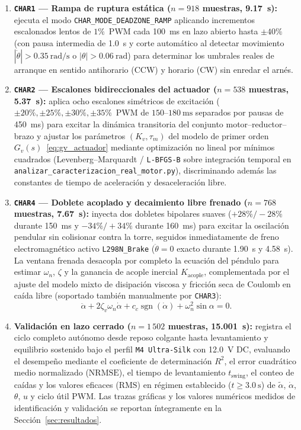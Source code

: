 \begin{enumerate}
    \item \textbf{\texttt{CHAR1} --- Rampa de ruptura estática ($n=918$ muestras, \qty{9.17}{\second}):} ejecuta el modo \texttt{CHAR\_MODE\_DEADZONE\_RAMP} aplicando incrementos escalonados lentos de $1\%$~PWM cada \qty{100}{\milli\second} en lazo abierto hasta $\pm 40\%$ (con pausa intermedia de \qty{1.0}{\second} y corte automático al detectar movimiento $|\dot{\theta}|>\qty{0.35}{\radian\per\second}$ o $|\theta|>\qty{0.06}{\radian}$) para determinar los umbrales reales de arranque en sentido antihorario (CCW) y horario (CW) sin enredar el arnés.
    \item \textbf{\texttt{CHAR2} --- Escalones bidireccionales del actuador ($n=538$ muestras, \qty{5.37}{\second}):} aplica ocho escalones simétricos de excitación ($\pm 20\%, \pm 25\%, \pm 30\%, \pm 35\%$~PWM de $150\text{--}\qty{180}{\milli\second}$ separados por pausas de \qty{450}{\milli\second}) para excitar la dinámica transitoria del conjunto motor--reductor--brazo y ajustar los parámetros $(K_v, \tau_m)$ del modelo de primer orden $G_v(s)$~\eqref{eq:gv_actuador} mediante optimización no lineal por mínimos cuadrados (Levenberg--Marquardt / \texttt{L-BFGS-B} sobre integración temporal en \texttt{analizar\_caracterizacion\_\allowbreak real\_motor.py}), discriminando además las constantes de tiempo de aceleración y desaceleración libre.
    \item \textbf{\texttt{CHAR4} --- Doblete acoplado y decaimiento libre frenado ($n=768$ muestras, \qty{7.67}{\second}):} inyecta dos dobletes bipolares suaves ($+28\%/-28\%$ durante \qty{150}{\milli\second} y $-34\%/+34\%$ durante \qty{160}{\milli\second}) para excitar la oscilación pendular sin colisionar contra la torre, seguidos inmediatamente de freno electromagnético activo \texttt{L298N\_Brake} ($\ddot{\theta}=0$ exacto durante \qty{1.90}{\second} y \qty{4.58}{\second}). La ventana frenada desacopla por completo la ecuación del péndulo para estimar $\omega_n$, $\zeta$ y la ganancia de acople inercial $K_{\text{acople}}$, complementada por el ajuste del modelo mixto de disipación viscosa y fricción seca de Coulomb en caída libre (soportado también manualmente por \texttt{CHAR3}):
    \begin{equation}
        \ddot{\alpha} + 2\zeta_v\omega_n\dot{\alpha} + c_c\operatorname{sgn}(\dot{\alpha}) + \omega_n^2\sin\alpha = 0.
        \label{eq:friccion_mixta}
    \end{equation}
    \item \textbf{Validación en lazo cerrado ($n=1\,502$ muestras, \qty{15.001}{\second}):} registra el ciclo completo autónomo desde reposo colgante hasta levantamiento y equilibrio sostenido bajo el perfil \texttt{M4 Ultra-Silk} con \qty{12.0}{\volt} DC, evaluando el desempeño mediante el coeficiente de determinación $R^2$, el error cuadrático medio normalizado ($\mathrm{NRMSE}$), el tiempo de levantamiento $t_{\text{swing}}$, el conteo de caídas y los valores eficaces ($\mathrm{RMS}$) en régimen establecido ($t\ge\qty{3.0}{\second}$) de $\tilde{\alpha}$, $\dot{\alpha}$, $\theta$, $u$ y ciclo útil PWM. Las trazas gráficas y los valores numéricos medidos de identificación y validación se reportan íntegramente en la Sección~\ref{sec:resultados}.

\end{enumerate}
